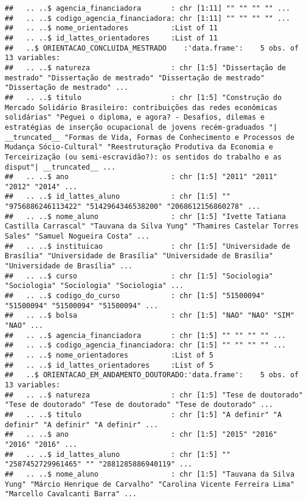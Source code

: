 \documentclass[]{article}
\begin{document}
\begin{verbatim}
##   .. ..$ agencia_financiadora       : chr [1:11] "" "" "" "" ...
##   .. ..$ codigo_agencia_financiadora: chr [1:11] "" "" "" "" ...
##   .. ..$ nome_orientadores          :List of 11
##   .. ..$ id_lattes_orientadores     :List of 11
##   ..$ ORIENTACAO_CONCLUIDA_MESTRADO    :'data.frame':    5 obs. of  13 variables:
##   .. ..$ natureza                   : chr [1:5] "Dissertação de mestrado" "Dissertação de mestrado" "Dissertação de mestrado" "Dissertação de mestrado" ...
##   .. ..$ titulo                     : chr [1:5] "Construção do Mercado Solidário Brasileiro: contribuições das redes econômicas solidárias" "Peguei o diploma, e agora? - Desafios, dilemas e estratégias de inserção ocupacional de jovens recém-graduados "| __truncated__ "Formas de Vida, Formas de Conhecimento e Processos de Mudança Sócio-Cultural" "Reestruturação Produtiva da Economia e Terceirização (ou semi-escravidão?): os sentidos do trabalho e as disput"| __truncated__ ...
##   .. ..$ ano                        : chr [1:5] "2011" "2011" "2012" "2014" ...
##   .. ..$ id_lattes_aluno            : chr [1:5] "" "9756886246113422" "5142964346538200" "2068612156860278" ...
##   .. ..$ nome_aluno                 : chr [1:5] "Ivette Tatiana Castilla Carrascal" "Tauvana da Silva Yung" "Thamires Castelar Torres Sales" "Samuel Nogueira Costa" ...
##   .. ..$ instituicao                : chr [1:5] "Universidade de Brasília" "Universidade de Brasília" "Universidade de Brasília" "Universidade de Brasília" ...
##   .. ..$ curso                      : chr [1:5] "Sociologia" "Sociologia" "Sociologia" "Sociologia" ...
##   .. ..$ codigo_do_curso            : chr [1:5] "51500094" "51500094" "51500094" "51500094" ...
##   .. ..$ bolsa                      : chr [1:5] "NAO" "NAO" "SIM" "NAO" ...
##   .. ..$ agencia_financiadora       : chr [1:5] "" "" "" "" ...
##   .. ..$ codigo_agencia_financiadora: chr [1:5] "" "" "" "" ...
##   .. ..$ nome_orientadores          :List of 5
##   .. ..$ id_lattes_orientadores     :List of 5
##   ..$ ORIENTACAO_EM_ANDAMENTO_DOUTORADO:'data.frame':    5 obs. of  13 variables:
##   .. ..$ natureza                   : chr [1:5] "Tese de doutorado" "Tese de doutorado" "Tese de doutorado" "Tese de doutorado" ...
##   .. ..$ titulo                     : chr [1:5] "A definir" "A definir" "A definir" "A definir" ...
##   .. ..$ ano                        : chr [1:5] "2015" "2016" "2016" "2016" ...
##   .. ..$ id_lattes_aluno            : chr [1:5] "" "2587452729961465" "" "2881285886940119" ...
##   .. ..$ nome_aluno                 : chr [1:5] "Tauvana da Silva Yung" "Márcio Henrique de Carvalho" "Carolina Vicente Ferreira Lima" "Marcello Cavalcanti Barra" ...

\end{verbatim}
\end{document}
